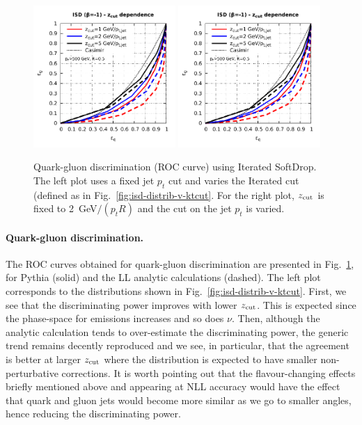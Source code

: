 \begin{figure}
  \includegraphics[width=0.48\textwidth,page=1]{figures/isd-roc.pdf}%
  \hfill%
  \includegraphics[width=0.48\textwidth,page=2]{figures/isd-roc.pdf}%
  \caption{Quark-gluon discrimination (ROC curve) using Iterated
    SoftDrop. The left plot uses a fixed jet $p_t$ cut and varies the
    Iterated \SD cut (defined as in
    Fig.~\ref{fig:isd-distrib-v-ktcut}. For the right plot, $z_{\text{cut}}$ is
    fixed to 2~GeV$/(p_tR)$ and the cut on the jet $p_t$ is
    varied.}\label{fig:isd-roc}
\end{figure}  

\paragraph{Quark-gluon discrimination.}
%
The ROC curves obtained for quark-gluon discrimination are presented
in Fig.~\ref{fig:isd-roc}, for Pythia (solid) and the LL analytic
calculations (dashed).
%
The left plot corresponds to the distributions shown in
Fig.~\ref{fig:isd-distrib-v-ktcut}.
%
First, we see that the discriminating power improves with lower
$z_{\text{cut}}$. This is expected since the phase-space for emissions
increases and so does $\nu$.
%
Then, although the analytic calculation tends to over-estimate the
discriminating power, the generic trend remains decently reproduced
and we see, in particular, that the agreement is better at larger
$z_{\text{cut}}$ where the distribution is expected to have smaller
non-perturbative corrections.
%
It is  worth pointing  out that  the flavour-changing  effects briefly
mentioned above  and appearing at  NLL accuracy would have  the effect
that  quark and  gluon jets  would  become more  similar as  we go  to
smaller angles, hence reducing the discriminating power.

